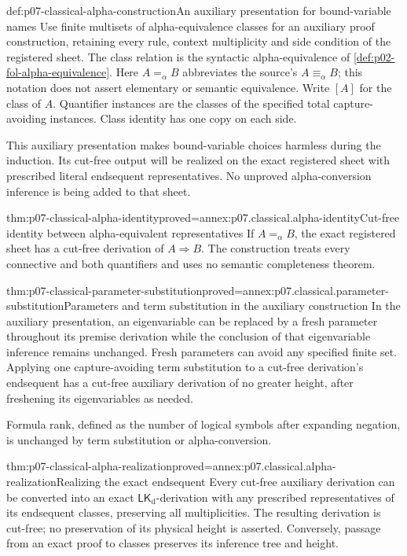 \begin{hbdefinition}{def:p07-classical-alpha-construction}{An auxiliary presentation for bound-variable names}
Use finite multisets of alpha-equivalence classes for an auxiliary proof
construction, retaining every rule, context multiplicity and side condition
of the registered sheet. The class relation is the syntactic
alpha-equivalence of \cref{def:p02-fol-alpha-equivalence}.
Here \(A=_{\alpha}B\) abbreviates the source's \(A\equiv_\alpha B\);
this notation does not assert elementary or semantic equivalence.
Write \([A]\) for the class of \(A\).
Quantifier instances are the classes of the specified total
capture-avoiding instances. Class identity has one copy on each side.

This auxiliary presentation makes bound-variable choices harmless during
the induction. Its cut-free output will be realized on the exact registered
sheet with prescribed literal endsequent representatives. No unproved
alpha-conversion inference is being added to that sheet.
\end{hbdefinition}

\begin{hblemma}{thm:p07-classical-alpha-identity}{proved=annex:p07.classical.alpha-identity}{Cut-free identity between alpha-equivalent representatives}
If \(A=_{\alpha}B\), the exact registered sheet has a cut-free derivation
of \(A\Rightarrow B\). The construction treats every connective and
both quantifiers and uses no semantic completeness theorem.
\end{hblemma}

\begin{hblemma}{thm:p07-classical-parameter-substitution}{proved=annex:p07.classical.parameter-substitution}{Parameters and term substitution in the auxiliary construction}
In the auxiliary presentation, an eigenvariable can be replaced by a fresh
parameter throughout its premise derivation while the conclusion of that
eigenvariable inference remains unchanged. Fresh parameters can avoid any
specified finite set.
Applying one capture-avoiding term substitution to a cut-free derivation's
endsequent has a cut-free auxiliary derivation of no greater height, after
freshening its eigenvariables as needed.

Formula rank, defined as the number of logical symbols after expanding
negation, is unchanged by term substitution or alpha-conversion.
\end{hblemma}

\begin{hblemma}{thm:p07-classical-alpha-realization}{proved=annex:p07.classical.alpha-realization}{Realizing the exact endsequent}
Every cut-free auxiliary derivation can be converted into an exact
\(\mathsf{LK}_{\mathrm d}\)-derivation with any prescribed representatives
of its endsequent classes, preserving all multiplicities. The resulting
derivation is cut-free; no preservation of its physical height is asserted.
Conversely, passage from an exact proof to classes preserves its inference
tree and height.
\end{hblemma}

